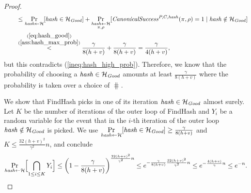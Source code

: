 \begin{proof}
\begin{align*}
  & \mbox\qquad \leq \underset{\operatorname{\mathit{hash}} \leftarrow \mathcal{H}}{\Pr}[\operatorname{\mathit{hash}} \in \mathcal{H}_{\mathit{Good}}] +
  \underset{\substack{\operatorname{\mathit{hash}} \leftarrow \mathcal{H} \\ \pi, \rho}}{\Pr}[\operatorname{\mathit{CanonicalSuccess}}^{P,C,\operatorname{\mathit{hash}}}(\pi, \rho) = 1 \mid \operatorname{\mathit{hash}} \notin \mathcal{H}_{\mathit{Good}}] \\
  & \mbox\qquad  \stackrel{\substack{ (\ref{eq:hash_good}) \\ (\ref{ass:hash_max_prob})}}{<} \frac{\gamma}{8(h+v)} + \frac{\gamma}{8(h+v)} = \frac{\gamma}{4(h+v)},
\end{align*}
but this contradicts (\ref{ineq:hash_high_prob}).
Therefore, we know that the probability of choosing a $\operatorname{\mathit{hash}} \in \mathcal{H}_{\mathit{Good}}$ amounts at least $\frac{\gamma}{8(h+v)}$
where the probability is taken over a choice of $\hash$.

We show that FindHash picks in one of its iteration $\operatorname{\mathit{hash}} \in \mathcal{H}_{\mathit{Good}}$ almost surely.
Let $K$ be the number of iterations of the outer loop of FindHash and $Y_i$ be a random variable for the event
that in the $i$-th iteration of the outer loop $\operatorname{\mathit{hash}} \notin \mathcal{H}_{\mathit{Good}}$ is picked.
We use $\underset{\operatorname{\mathit{hash}} \leftarrow \mathcal{H}}{\Pr}[\operatorname{\mathit{hash}} \in \mathcal{H}_{\textit{Good}}] \geq \frac{\gamma}{8(h+v)}$ and $K \leq \frac{32(h+v)^2}{\gamma^2}n$, and conclude
\begin{align*}
  \underset{\operatorname{\mathit{hash}} \leftarrow \mathcal{H}}{\Pr}\Bigl[ \bigcap_{1 \leq i \leq K} Y_i \Bigr] \leq \left(1 - \frac{\gamma}{8(h+v)}\right)^{\frac{32(h+v)^2}{\gamma^2}n}
    \leq e^{-\frac{\gamma}{8(h+v)} \frac{32(h+v)^2}{\gamma^2}n}
    \leq e^{-\frac{4(h+v)}{\gamma}n} \leq e^{-n}.
\end{align*}

\end{proof}

